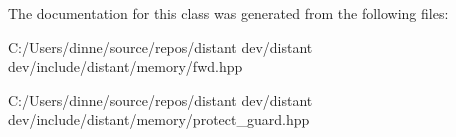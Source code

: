 The documentation for this class was generated from the following files\+:\begin{DoxyCompactItemize}
\item 
C\+:/\+Users/dinne/source/repos/distant dev/distant dev/include/distant/memory/fwd.\+hpp\item 
C\+:/\+Users/dinne/source/repos/distant dev/distant dev/include/distant/memory/protect\+\_\+guard.\+hpp\end{DoxyCompactItemize}
